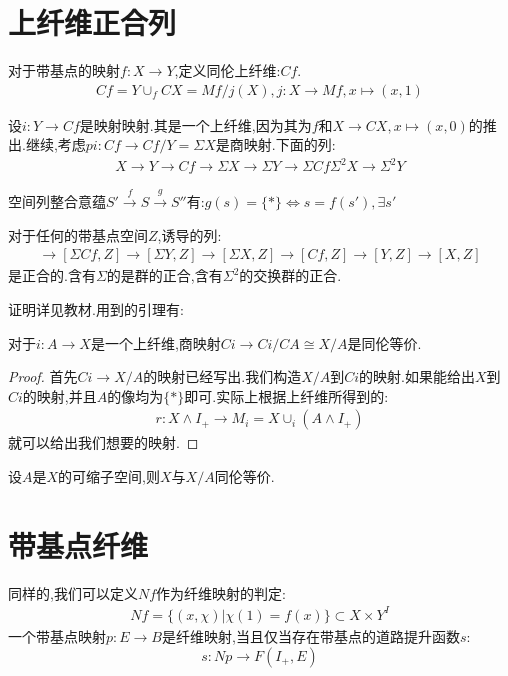 \section{上纤维正合列}
对于带基点的映射$f:X \to Y$,定义同伦上纤维:$Cf$.
\begin{align*}
    Cf=Y\cup_f CX=Mf/j(X),j:X \to Mf, x \mapsto (x,1)
\end{align*}

设$i:Y \to Cf$是映射映射.其是一个上纤维,因为其为$f$和$X \to CX,x \mapsto (x,0)$的推出.继续,考虑$pi:Cf \to Cf/Y=\Sigma X$是商映射.下面的列:
\begin{align*}
    X \to Y \to Cf \to \Sigma X \to \Sigma Y \to \Sigma Cf \Sigma^2 X \to \Sigma^2 Y
\end{align*}
\begin{definition}
    空间列整合意蕴$S' \stackrel{f}{\to} S \stackrel{g}{\to} S''$有:$g(s)=\{*\} \Leftrightarrow s=f(s'),\exists s'$
\end{definition}

\begin{theorem}
    对于任何的带基点空间$Z$,诱导的列:
    \begin{align*}
        \to [\Sigma Cf,Z] \to [\Sigma Y,Z] \to [\Sigma X,Z] \to [Cf,Z]\to [Y,Z] \to [X,Z]
    \end{align*}
    是正合的.含有$\Sigma$的是群的正合,含有$\Sigma^2$的交换群的正合.
\end{theorem}

证明详见教材.用到的引理有:
\begin{lemma}
    对于$i:A \to X$是一个上纤维,商映射$Ci \to Ci/CA\cong X/A$是同伦等价.
\end{lemma}
\begin{proof}
    首先$Ci \to X/A$的映射已经写出.我们构造$X/A$到$Ci$的映射.如果能给出$X$到$Ci$的映射,并且$A$的像均为$\{*\}$即可.实际上根据上纤维所得到的:
    \begin{align*}
        r: X\wedge I_{+} \to M_i=X \cup_i (A\wedge I_{+})
    \end{align*}
    就可以给出我们想要的映射.
\end{proof}
\begin{lemma}
    设$A$是$X$的可缩子空间,则$X$与$X/A$同伦等价.
\end{lemma}

\section{带基点纤维}
同样的,我们可以定义$Nf$作为纤维映射的判定:
\begin{align*}
    Nf=\{(x,\chi)|\chi(1)=f(x)\} \subset X \times Y^I
\end{align*}
一个带基点映射$p:E \to B$是纤维映射,当且仅当存在带基点的道路提升函数$s$:
$$
s:Np \to F(I_{+},E)
$$
